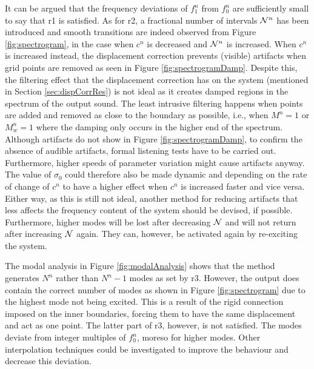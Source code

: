 It can be argued that the frequency deviations of $f_1^n$ from $f_0^n$ are sufficiently small to say that r1 is satisfied. As for r2, a fractional number of intervals $\mathcal{N}^n$ has been introduced and smooth transitions are indeed observed from Figure \ref{fig:spectrogram}, in the case when $c^n$ is decreased and $\mathcal{N}^n$ is increased. When $c^n$ is increased instead, the displacement correction prevents (visible) artifacts when grid points are removed as seen in Figure \ref{fig:spectrogramDamp}. Despite this, the filtering effect that the displacement correction has on the system (mentioned in Section \ref{sec:dispCorrRes}) is not ideal as it creates damped regions in the spectrum of the output sound. The least intrusive filtering happens when points are added and removed as close to the boundary as possible, i.e., when $M^n = 1$ or $M_w^n = 1$ where the damping only occurs in the higher end of the spectrum. Although artifacts do not show in Figure \ref{fig:spectrogramDamp}, to confirm the absence of audible artifacts, formal listening tests have to be carried out. Furthermore, higher speeds of parameter variation might cause artifacts anyway. The value of $\sigma_0$ could therefore also be made dynamic and depending on the rate of change of $c^n$ to have a higher effect when $c^n$ is increased faster and vice versa.
Either way, as this is still not ideal, another method for reducing artifacts that less affects the frequency content of the system should be devised, if possible. Furthermore, higher modes will be lost after decreasing $\mathcal{N}$ and will not return after increasing $\mathcal{N}$ again. They can, however, be activated again by re-exciting the system. 

The modal analysis in Figure \ref{fig:modalAnalysis} shows that the method generates $N^n$ rather than $N^n - 1$ modes as set by r3. However, the output does contain the correct number of modes as shown in Figure \ref{fig:spectrogram} due to the highest mode not being excited. This is a result of the rigid connection imposed on the inner boundaries, forcing them to have the same displacement and act as one point. %
%
The latter part of r3, however, is not satisfied. The modes deviate from integer multiples of $f_0^n$, moreso for higher modes. Other interpolation techniques could be investigated to improve the behaviour and decrease this deviation.

